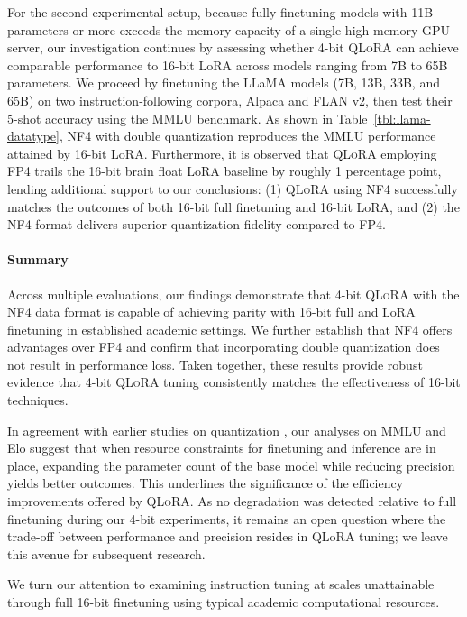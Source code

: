 For the second experimental setup, because fully finetuning models with 11B parameters or more exceeds the memory capacity of a single high-memory GPU server, our investigation continues by assessing whether 4-bit \textsc{QLoRA} can achieve comparable performance to 16-bit LoRA across models ranging from 7B to 65B parameters. We proceed by finetuning the LLaMA models (7B, 13B, 33B, and 65B) on two instruction-following corpora, Alpaca and FLAN v2, then test their 5-shot accuracy using the MMLU benchmark. As shown in Table~\ref{tbl:llama-datatype}, NF4 with double quantization reproduces the MMLU performance attained by 16-bit LoRA. Furthermore, it is observed that \textsc{QLoRA} employing FP4 trails the 16-bit brain float LoRA baseline by roughly 1 percentage point, lending additional support to our conclusions: (1) \textsc{QLoRA} using NF4 successfully matches the outcomes of both 16-bit full finetuning and 16-bit LoRA, and (2) the NF4 format delivers superior quantization fidelity compared to FP4.

\paragraph{Summary} Across multiple evaluations, our findings demonstrate that 4-bit \textsc{QLoRA} with the NF4 data format is capable of achieving parity with 16-bit full and LoRA finetuning in established academic settings. We further establish that NF4 offers advantages over FP4 and confirm that incorporating double quantization does not result in performance loss. Taken together, these results provide robust evidence that 4-bit \textsc{QLoRA} tuning consistently matches the effectiveness of 16-bit techniques.

In agreement with earlier studies on quantization \citep{dettmers2022case}, our analyses on MMLU and Elo suggest that when resource constraints for finetuning and inference are in place, expanding the parameter count of the base model while reducing precision yields better outcomes. This underlines the significance of the efficiency improvements offered by \textsc{QLoRA}. As no degradation was detected relative to full finetuning during our 4-bit experiments, it remains an open question where the trade-off between performance and precision resides in QLoRA tuning; we leave this avenue for subsequent research.

We turn our attention to examining instruction tuning at scales unattainable through full 16-bit finetuning using typical academic computational resources.

